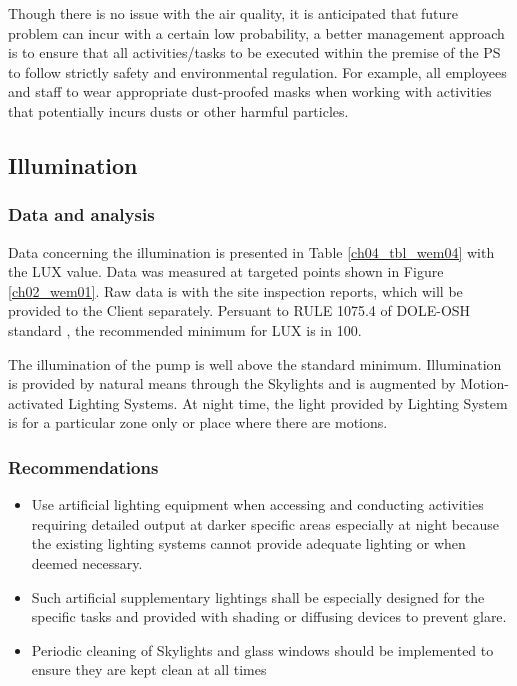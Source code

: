 Though there is no issue with the air quality, it is anticipated that future problem can incur with a certain low probability, a better management approach is to ensure that all activities/tasks to be executed within the premise of the PS to follow strictly safety and environmental regulation. For example, all employees and staff to wear appropriate dust-proofed masks when working with activities that potentially incurs dusts or other harmful particles.



\subsection{Illumination}\label{aq03}
\subsubsection{Data and analysis}
Data concerning the illumination is presented in Table \ref{ch04_tbl_wem04} with the LUX value. Data was measured at targeted points shown in Figure \ref{ch02_wem01}. Raw data is with the site inspection reports, which will be provided to the Client separately. Persuant to RULE 1075.4 of DOLE-OSH standard \cite{DOLE2016}, the recommended minimum for LUX is in 100.



The illumination of the pump is well above the standard minimum. Illumination is provided by natural means through the Skylights and is augmented by Motion-activated Lighting Systems. At night time, the light provided by Lighting System is for a particular zone only or place where there are motions.

\subsubsection{Recommendations}

\begin{itemize}
	\item	Use artificial lighting equipment when accessing and conducting activities requiring detailed output at darker specific areas especially at night because the existing lighting systems cannot provide adequate lighting or when deemed necessary.
	\item	Such artificial supplementary lightings shall be especially designed for the specific tasks and provided with shading or diffusing devices to prevent glare.
	\item	Periodic cleaning of Skylights and glass windows should be implemented to ensure they are kept clean at all times
	
\end{itemize}


